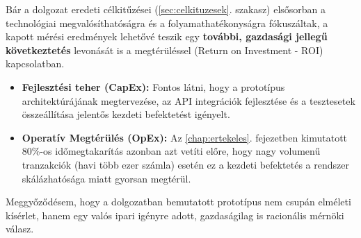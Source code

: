 Bár a dolgozat eredeti célkitűzései (\ref{sec:celkituzesek}. szakasz) elsősorban a technológiai megvalósíthatóságra és a folyamathatékonyságra fókuszáltak, a kapott mérési eredmények lehetővé teszik egy \textbf{további, gazdasági jellegű következtetés} levonását is a megtérüléssel (Return on Investment - ROI) kapcsolatban.

\begin{itemize}
    \item \textbf{Fejlesztési teher (CapEx):} Fontos látni, hogy a prototípus architektúrájának megtervezése, az API integrációk fejlesztése és a tesztesetek összeállítása jelentős kezdeti befektetést igényelt.
    \item \textbf{Operatív Megtérülés (OpEx):} Az \ref{chap:ertekeles}. fejezetben kimutatott 80\%-os időmegtakarítás azonban azt vetíti előre, hogy nagy volumenű tranzakciók (havi több ezer számla) esetén ez a kezdeti befektetés a rendszer skálázhatósága miatt gyorsan megtérül.
\end{itemize}

Meggyőződésem, hogy a dolgozatban bemutatott prototípus nem csupán elméleti kísérlet, hanem egy valós ipari igényre adott, gazdaságilag is racionális mérnöki válasz.